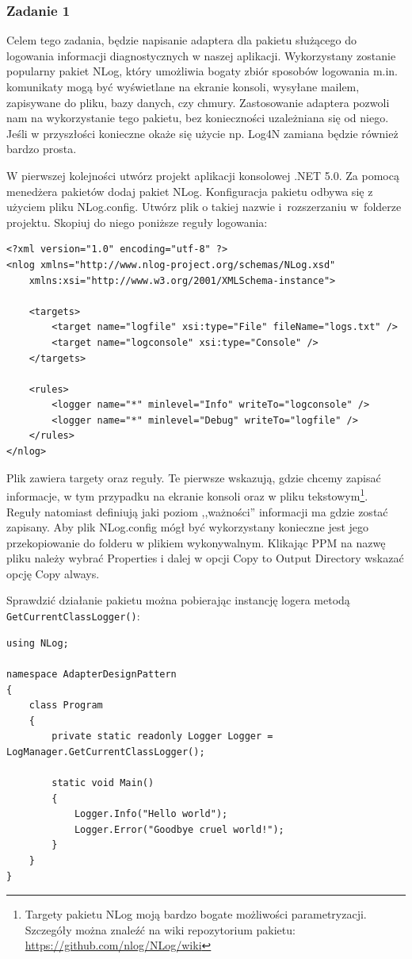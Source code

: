 \subsubsection{Zadanie 1}
Celem tego zadania, będzie napisanie adaptera dla pakietu służącego do logowania informacji diagnostycznych w naszej aplikacji. Wykorzystany zostanie popularny pakiet NLog, który umożliwia bogaty zbiór sposobów logowania m.in. komunikaty mogą być wyświetlane na ekranie konsoli, wysyłane mailem, zapisywane do pliku, bazy danych, czy chmury. Zastosowanie adaptera pozwoli nam na wykorzystanie tego pakietu, bez konieczności uzależniana się od niego. Jeśli w przyszłości konieczne okaże się użycie np. Log4N zamiana będzie również bardzo prosta.  

W pierwszej kolejności utwórz projekt aplikacji konsolowej .NET 5.0. Za pomocą menedżera pakietów dodaj pakiet NLog. Konfiguracja pakietu odbywa się z użyciem pliku NLog.config. Utwórz plik o takiej nazwie i~rozszerzaniu w~folderze projektu. Skopiuj do niego poniższe reguły logowania:
\begin{lstlisting}[caption={Konfiguracja pakietu NLog}, label={lab3/lst/nlogConfig}]
<?xml version="1.0" encoding="utf-8" ?>
<nlog xmlns="http://www.nlog-project.org/schemas/NLog.xsd"
	xmlns:xsi="http://www.w3.org/2001/XMLSchema-instance">

	<targets>
		<target name="logfile" xsi:type="File" fileName="logs.txt" />
		<target name="logconsole" xsi:type="Console" />
	</targets>

	<rules>
		<logger name="*" minlevel="Info" writeTo="logconsole" />
		<logger name="*" minlevel="Debug" writeTo="logfile" />
	</rules>
</nlog>
\end{lstlisting}
Plik zawiera targety oraz reguły. Te pierwsze wskazują, gdzie chcemy zapisać informacje, w tym przypadku na ekranie konsoli oraz w pliku tekstowym\footnote{Targety pakietu NLog moją bardzo bogate możliwości parametryzacji. Szczegóły można znaleźć na wiki repozytorium pakietu: \url{https://github.com/nlog/NLog/wiki}}. Reguły natomiast definiują jaki poziom ,,ważności'' informacji ma gdzie zostać zapisany. Aby plik NLog.config mógł być wykorzystany konieczne jest jego przekopiowanie do folderu w plikiem wykonywalnym. Klikając PPM na nazwę pliku należy wybrać Properties i dalej w opcji Copy to Output Directory wskazać opcję Copy always.

Sprawdzić działanie pakietu można pobierając instancję logera metodą \texttt{GetCurrentClassLogger()}:
\begin{lstlisting}[caption={Wywołanie metod logujących pakietu NLog}, label={lab3/lst/nlogPackageTest}]
using NLog;

namespace AdapterDesignPattern
{
	class Program
	{
		private static readonly Logger Logger = LogManager.GetCurrentClassLogger();
		
		static void Main()
		{
			Logger.Info("Hello world");
			Logger.Error("Goodbye cruel world!");
		}
	}
}
\end{lstlisting}


